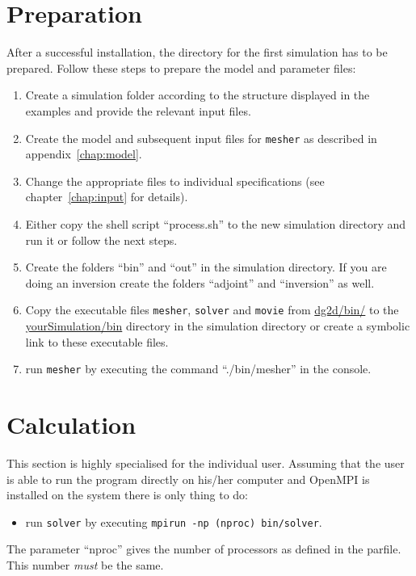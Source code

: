 	\section{Preparation}
	\label{sec:prep}
		After a successful installation, the directory for the first simulation has to be prepared. Follow these steps to prepare the model and parameter files:
		\begin{enumerate}
			\item Create a simulation folder according to the structure displayed in the examples and provide the relevant input files.
			\item Create the model and subsequent input files for \texttt{mesher} as described in appendix~\ref{chap:model}.
			\item Change the appropriate files to individual specifications (see chapter~\ref{chap:input} for details).
			\item Either copy the shell script ``process.sh'' to the new simulation directory and run it or follow the next steps.
			\item Create the folders ``bin'' and ``out'' in the simulation directory. If you are doing an inversion create the folders ``adjoint'' and ``inversion'' as well.
			\item Copy the executable files \texttt{mesher}, \texttt{solver} and \texttt{movie} from \url{dg2d/bin/} to the \url{yourSimulation/bin} directory in the simulation directory or create a symbolic link to these executable files.
			\item run \texttt{mesher} by executing the command ``./bin/mesher'' in the console.
		\end{enumerate}
		
	\section{Calculation}
	\label{sec:calc}
		This section is highly specialised for the individual user. Assuming that the user is able to run the program directly on his/her computer and OpenMPI is installed on the system there is only thing to do: 
		\begin{itemize}
			\item run \texttt{solver} by executing \texttt{mpirun -np (nproc) bin/solver}.
		\end{itemize}
		The parameter ``nproc'' gives the number of processors as defined in the parfile. This number \textit{must} be the same.
		
